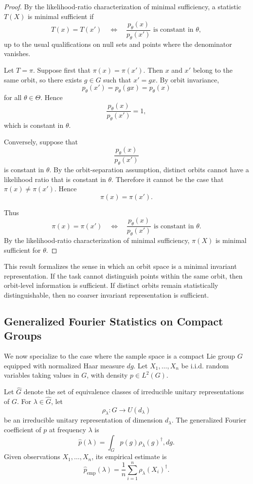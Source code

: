 \documentclass{ssl}
\begin{document}
\begin{proof}
By the likelihood-ratio characterization of minimal sufficiency, a statistic
\(T(X)\) is minimal sufficient if
\[
T(x)=T(x')
\quad\Longleftrightarrow\quad
\frac{p_\theta(x)}{p_\theta(x')}
\text{ is constant in }\theta,
\]
up to the usual qualifications on null sets and points where the denominator
vanishes.

Let \(T=\pi\). Suppose first that \(\pi(x)=\pi(x')\). Then \(x\) and \(x'\)
belong to the same orbit, so there exists \(g\in G\) such that \(x'=gx\).
By orbit invariance,
\[
p_\theta(x')=p_\theta(gx)=p_\theta(x)
\]
for all \(\theta\in\Theta\). Hence
\[
\frac{p_\theta(x)}{p_\theta(x')}=1,
\]
which is constant in \(\theta\).

Conversely, suppose that
\[
\frac{p_\theta(x)}{p_\theta(x')}
\]
is constant in \(\theta\). By the orbit-separation assumption, distinct orbits
cannot have a likelihood ratio that is constant in \(\theta\). Therefore it
cannot be the case that \(\pi(x)\neq \pi(x')\). Hence
\[
\pi(x)=\pi(x').
\]

Thus
\[
\pi(x)=\pi(x')
\quad\Longleftrightarrow\quad
\frac{p_\theta(x)}{p_\theta(x')}
\text{ is constant in }\theta.
\]
By the likelihood-ratio characterization of minimal sufficiency, \(\pi(X)\)
is minimal sufficient for \(\theta\).
\end{proof}

This result formalizes the sense in which an orbit space is a minimal invariant representation. If the task cannot distinguish points within the same orbit, then orbit-level information is sufficient. If distinct orbits remain statistically distinguishable, then no coarser invariant representation is sufficient.

\subsection{Generalized Fourier Statistics on Compact Groups}

We now specialize to the case where the sample space is a compact Lie group $G$ equipped with normalized Haar measure $dg$. Let $X_1,\dots,X_n$ be i.i.d. random variables taking values in $G$, with density $p\in L^2(G)$.

Let $\widehat G$ denote the set of equivalence classes of irreducible unitary representations of $G$. For $\lambda\in\widehat G$, let
$$
\rho_\lambda:G\to U(d_\lambda)
$$
be an irreducible unitary representation of dimension $d_\lambda$. The generalized Fourier coefficient of $p$ at frequency $\lambda$ is
$$
\widehat p(\lambda)
=
\int_G p(g)\rho_\lambda(g)^\dagger,dg.
$$
Given observations $X_1,\dots,X_n$, its empirical estimate is
$$
\widehat p_{\mathrm{emp}}(\lambda)
=
\frac{1}{n}\sum_{i=1}^n \rho_\lambda(X_i)^\dagger.
$$
\end{document}
